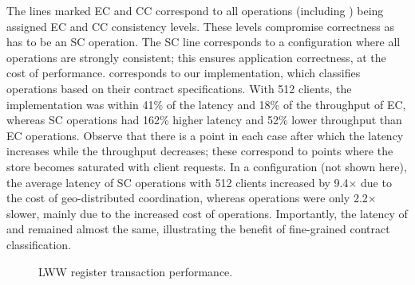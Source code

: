 The lines marked EC and CC correspond to all operations (including
) being assigned EC and CC consistency levels. These levels
compromise correctness as  has to be an SC operation. The SC line
corresponds to a configuration where all operations are strongly consistent;
this ensures application correctness, at the cost of performance. \name
corresponds to our implementation, which classifies operations based on their
contract specifications. With 512 clients, the \name implementation was within
41\% of the latency and 18\% of the throughput of EC, whereas SC operations had
162\% higher latency and 52\% lower throughput than EC operations. Observe that
there is a point in each case after which the latency increases while the
throughput decreases; these correspond to points where the store becomes
saturated with client requests. In a  configuration (not shown here),
the average latency of SC operations with 512 clients increased by 9.4$\times$
due to the cost of geo-distributed coordination, whereas \name operations were
only 2.2$\times$ slower, mainly due to the increased cost of 
operations. Importantly, the latency of  and 
remained almost the same, illustrating the benefit of fine-grained contract
classification.

\begin{figure}
  \centering
	\caption{LWW register transaction performance.}
  \label{grf:LWW-txn}
\end{figure}

